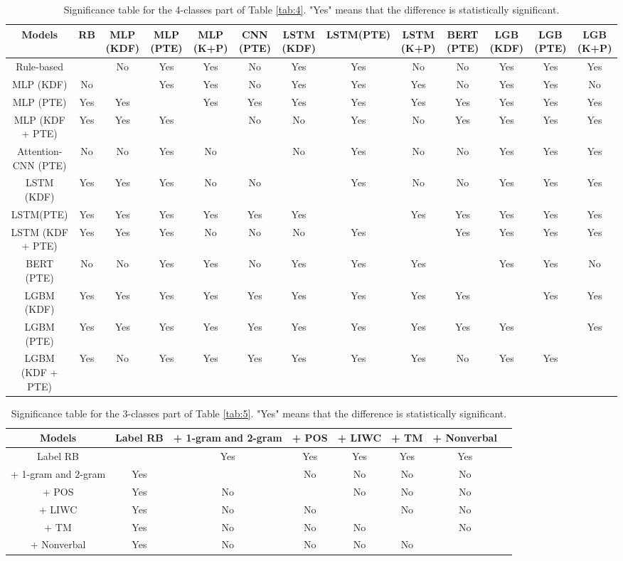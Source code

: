 \documentclass[11pt]{article}
\begin{document}
\begin{table}[t]
  \tabcolsep=0.05cm
  \tiny
  \centering
  \begin{tabular}{c|cccccccccccc} \toprule 
    Models & RB & MLP (KDF) & MLP (PTE) & MLP (K+P) & CNN (PTE) & LSTM (KDF) & LSTM(PTE) & LSTM (K+P) & BERT (PTE) & LGB (KDF) & LGB (PTE) & LGB (K+P) \\ \midrule 
    Rule-based & & No & Yes & Yes & No & Yes & Yes & No & No & Yes & Yes & Yes \\ 
    MLP (KDF) & No & & Yes & Yes & No & Yes & Yes & Yes & No & Yes & Yes & No \\ 
    MLP (PTE) & Yes & Yes & & Yes & Yes & Yes & Yes & Yes & Yes & Yes & Yes & Yes \\
    MLP (KDF + PTE) & Yes & Yes & Yes & & No & No & Yes & No & Yes & Yes & Yes & Yes \\
    Attention-CNN (PTE) & No & No & Yes & No & & No & Yes & No & No & Yes & Yes & Yes \\
    LSTM (KDF) & Yes & Yes & Yes & No & No & & Yes & No & No & Yes & Yes & Yes \\
    LSTM(PTE) & Yes & Yes & Yes & Yes & Yes & Yes & & Yes & Yes & Yes & Yes & Yes \\
    LSTM (KDF + PTE) & Yes & Yes & Yes & No & No & No & Yes & & Yes & Yes & Yes & Yes \\
    BERT (PTE) & No & No & Yes & Yes & No & Yes & Yes & Yes & & Yes & Yes & No \\
    LGBM (KDF) & Yes & Yes & Yes & Yes & Yes & Yes & Yes & Yes & Yes & & Yes & Yes \\
    LGBM (PTE) & Yes & Yes & Yes & Yes & Yes & Yes & Yes & Yes & Yes & Yes & & Yes \\
    LGBM (KDF + PTE) & Yes & No & Yes & Yes & Yes & Yes & Yes & Yes & No & Yes & Yes & \\ \bottomrule
  \end{tabular}
  \caption{Significance table for the 4-classes part of Table \ref{tab:4}. "Yes" means that the difference is statistically significant.}
  \label{tab:9}
\end{table}

\begin{table}[t]
  \tabcolsep=0.2cm
  \small
  \centering
  \begin{tabular}{c|ccccccc} \toprule 
    Models & Label RB & + 1-gram and 2-gram & + POS & + LIWC & + TM  & + Nonverbal \\ \midrule 
    Label RB & & Yes & Yes & Yes & Yes & Yes\\ 
    + 1-gram and 2-gram & Yes & & No & No & No & No \\ 
    + POS & Yes & No & & No & No & No\\
    + LIWC & Yes & No & No & & No & No \\
    + TM & Yes & No & No & No & & No \\
    + Nonverbal & Yes & No & No & No & No & \\ \bottomrule
  \end{tabular}
  \caption{Significance table for the 3-classes part of Table \ref{tab:5}. "Yes" means that the difference is statistically significant.}
  \label{tab:10}
\end{table}
\end{document}
